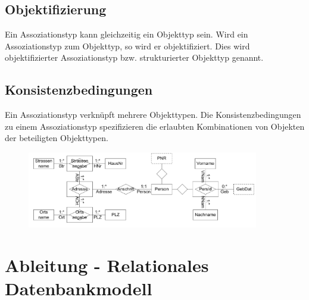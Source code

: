 \documentclass[a4paper,10pt]{scrartcl}
\begin{document}
\subsection{Objektifizierung}
Ein Assoziationstyp kann gleichzeitig ein Objekttyp sein. 
Wird ein Assoziationstyp zum Objekttyp, so wird er objektifiziert. Dies wird objektifizierter Assoziationstyp bzw. strukturierter Objekttyp genannt.
\subsection{Konsistenzbedingungen}
Ein Assoziationstyp verknüpft mehrere Objekttypen. Die Konsistenzbedingungen zu einem Assoziationstyp spezifizieren die erlaubten Kombinationen von Objekten der beteiligten Objekttypen.\newline
\begin{figure}[h]
	\includegraphics[width = 0.9\textwidth]{Informationsstruktur.PNG}
\end{figure}
\newpage
\section{Ableitung - Relationales Datenbankmodell}
\end{document}
